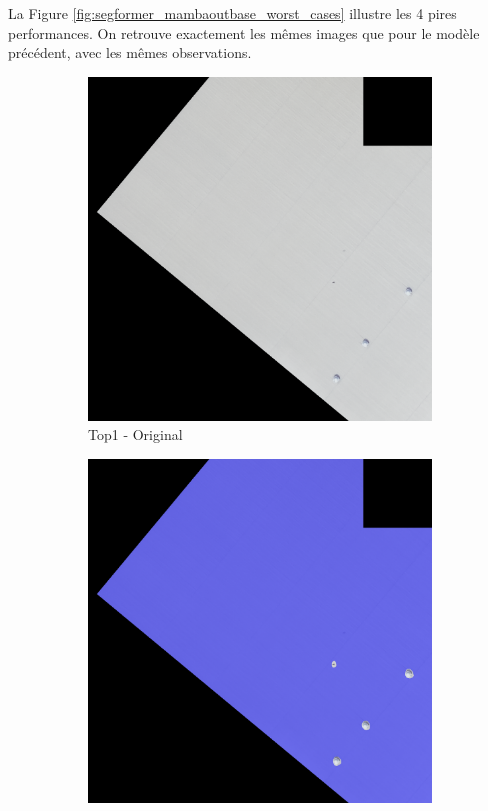 La Figure \ref{fig:segformer_mambaoutbase_worst_cases} illustre les 4 pires performances. On retrouve exactement les mêmes images que pour le modèle précédent, avec les mêmes observations.

\begin{figure}[H]
\centering
\begin{subfigure}{0.32\textwidth}
    \includegraphics[width=\textwidth]{02-main//figures/ch4/kfold_ensembles/segformer_tu-mambaout_base/best_cases/best_5_iou0.997_24991116_tile_5_3_322356_original.png}
    \caption{Top1 - Original}
\end{subfigure}
\hfill
\begin{subfigure}{0.32\textwidth}
    \includegraphics[width=\textwidth]{02-main//figures/ch4/kfold_ensembles/segformer_tu-mambaout_base/best_cases/best_5_iou0.997_24991116_tile_5_3_322356_overlay_gt.png}

\end{subfigure}
\end{figure}
